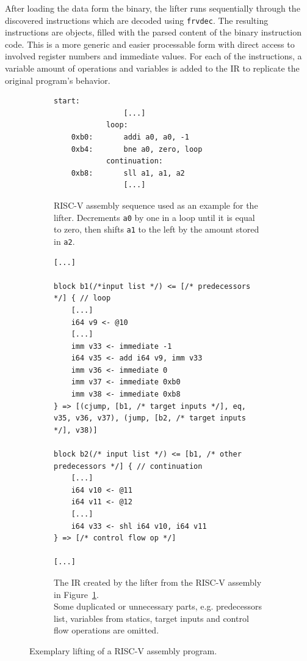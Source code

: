 \documentclass[course=eragp]{aspdoc}
\begin{document}
After loading the data form the binary, the lifter runs sequentially through the discovered
instructions which are decoded using \texttt{frvdec}\cite{frvdec}. The resulting instructions are objects,
filled with the parsed content of the binary instruction code. This is a
more generic and easier processable form with direct access to involved register numbers and
immediate values. For each of the instructions, a variable amount of operations and variables is added to
the IR to replicate the original program's behavior.

\begin{figure}
    \begin{subfigure}{\textwidth}
        \centering
        \begin{lstlisting}[language={[RISC-V]Assembler}]
            start:
                [...]
            loop:
    0xb0:       addi a0, a0, -1
    0xb4:       bne a0, zero, loop
            continuation:
    0xb8:       sll a1, a1, a2
                [...]
        \end{lstlisting}
        \caption{RISC-V assembly sequence used as an example for the lifter. Decrements \texttt{a0} by one
            in a loop until it is equal to zero,
            then shifts \texttt{a1} to the left by the amount stored in \texttt{a2}.}\label{fig:lifting_example_riscv}
        \vspace{1em}
    \end{subfigure}
    \begin{subfigure}{\textwidth}
        \centering
        \begin{lstlisting}
[...]

block b1(/*input list */) <= [/* predecessors */] { // loop
    [...]
    i64 v9 <- @10
    [...]
    imm v33 <- immediate -1
    i64 v35 <- add i64 v9, imm v33
    imm v36 <- immediate 0
    imm v37 <- immediate 0xb0
    imm v38 <- immediate 0xb8
} => [(cjump, [b1, /* target inputs */], eq, v35, v36, v37), (jump, [b2, /* target inputs */], v38)]

block b2(/* input list */) <= [b1, /* other predecessors */] { // continuation
    [...]
    i64 v10 <- @11
    i64 v11 <- @12
    [...]
    i64 v33 <- shl i64 v10, i64 v11
} => [/* control flow op */]

[...]
    \end{lstlisting}
        \caption{The IR created by the lifter from the RISC-V assembly in Figure~\ref{fig:lifting_example_riscv}. \\
            Some duplicated or unnecessary parts, e.g. predecessors list, variables from statics, target
            inputs and control flow operations are omitted.}\label{fig:lifting_example_ir}
    \end{subfigure}
    \caption{Exemplary lifting of a RISC-V assembly program.}
\end{figure}
\end{document}
